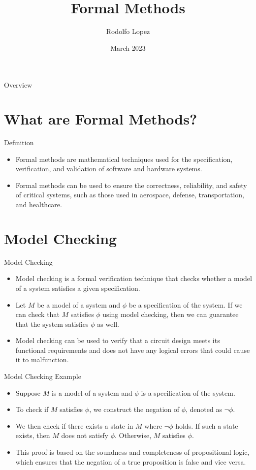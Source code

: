 \documentclass{beamer}
\title{Formal Methods}
\author{Rodolfo Lopez}
\institute{USD}
\date[March 2023]{March 2023}
\begin{document}
\begin{frame}
\titlepage
\end{frame}

\begin{frame}{Overview}
\tableofcontents
\end{frame}

\section{What are Formal Methods?}

\begin{frame}{Definition}
\begin{itemize}
\item Formal methods are mathematical techniques used for the specification, verification, and validation of software and hardware systems.
\item Formal methods can be used to ensure the correctness, reliability, and safety of critical systems, such as those used in aerospace, defense, transportation, and healthcare.
\end{itemize}
\end{frame}

\section{Model Checking}

\begin{frame}{Model Checking}
\begin{itemize}
\item Model checking is a formal verification technique that checks whether a model of a system satisfies a given specification.
\item Let $M$ be a model of a system and $\phi$ be a specification of the system. If we can check that $M$ satisfies $\phi$ using model checking, then we can guarantee that the system satisfies $\phi$ as well.
\item Model checking can be used to verify that a circuit design meets its functional requirements and does not have any logical errors that could cause it to malfunction.
\end{itemize}
\end{frame}

\begin{frame}{Model Checking Example}
\begin{itemize}
\item Suppose $M$ is a model of a system and $\phi$ is a specification of the system.
\item To check if $M$ satisfies $\phi$, we construct the negation of $\phi$, denoted as $\neg \phi$.
\item We then check if there exists a state in $M$ where $\neg \phi$ holds. If such a state exists, then $M$ does not satisfy $\phi$. Otherwise, $M$ satisfies $\phi$.
\item This proof is based on the soundness and completeness of propositional logic, which ensures that the negation of a true proposition is false and vice versa.
\end{itemize}
\end{frame}
\end{document}
